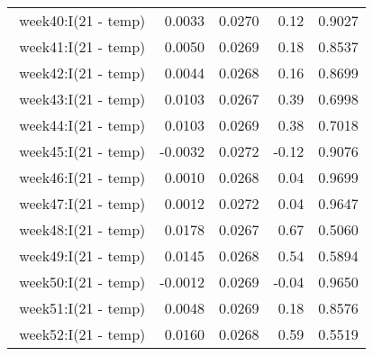 \begin{table}[ht]
\begin{tabular}{rrrrr}
$$  week40:I(21 - temp) & 0.0033 & 0.0270 & 0.12 & 0.9027 \\ 
  week41:I(21 - temp) & 0.0050 & 0.0269 & 0.18 & 0.8537 \\ 
  week42:I(21 - temp) & 0.0044 & 0.0268 & 0.16 & 0.8699 \\ 
  week43:I(21 - temp) & 0.0103 & 0.0267 & 0.39 & 0.6998 \\ 
  week44:I(21 - temp) & 0.0103 & 0.0269 & 0.38 & 0.7018 \\ 
  week45:I(21 - temp) & -0.0032 & 0.0272 & -0.12 & 0.9076 \\ 
  week46:I(21 - temp) & 0.0010 & 0.0268 & 0.04 & 0.9699 \\ 
  week47:I(21 - temp) & 0.0012 & 0.0272 & 0.04 & 0.9647 \\ 
  week48:I(21 - temp) & 0.0178 & 0.0267 & 0.67 & 0.5060 \\ 
  week49:I(21 - temp) & 0.0145 & 0.0268 & 0.54 & 0.5894 \\ 
  week50:I(21 - temp) & -0.0012 & 0.0269 & -0.04 & 0.9650 \\ 
  week51:I(21 - temp) & 0.0048 & 0.0269 & 0.18 & 0.8576 \\ 
  week52:I(21 - temp) & 0.0160 & 0.0268 & 0.59 & 0.5519 \\ 
   \hline
\end{tabular}
\end{table}
